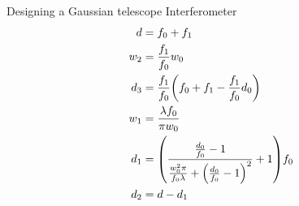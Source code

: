 \documentclass[hyperref={colorlinks=true,urlcolor=blue,linkcolor=.},aspectratio=1610,mathserif]{beamer}
\begin{document}
\begin{frame}{Designing a Gaussian telescope Interferometer}
	\begin{align}
		d   & = f_0 + f_1                                                                                    \\
		w_2 & = \frac{f_1}{f_0}w_0                                                                           \\
		d_3 & = \frac{f_1}{f_0}\pqty{f_0+f_1-\frac{f_1}{f_0}d_0}                                             \\
		w_1 & = \frac{\lambda f_0}{\pi w_0}                                                                  \\
		d_1 & = \pqty{\frac{\frac{d_0}{f_0}-1}{\frac{w_0^2\pi}{f_0\lambda}+\pqty{\frac{d_0}{f_0}-1}^2}+1}f_0 \\
		d_2 & = d-d_1
	\end{align}
\end{frame}
\end{document}

